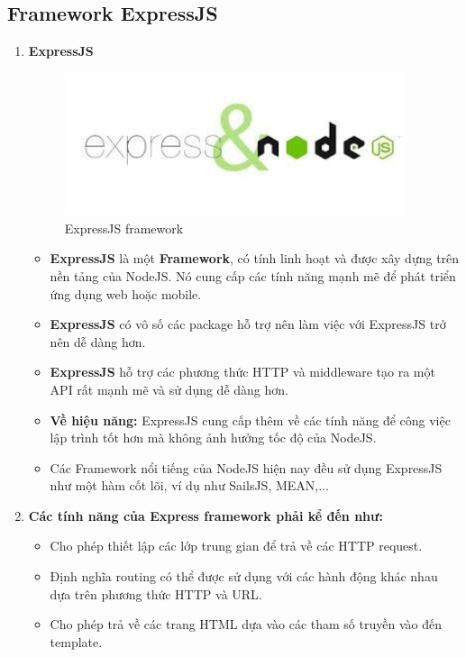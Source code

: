 \subsection{Framework ExpressJS}
\begin{enumerate}
    \item \textbf{ExpressJS}
    \begin{figure}[H]
        \centering
        \includegraphics[width = 10cm]{image/express-js.jpg}
        \caption{ExpressJS framework}
        \label{fig:express_JS_framework}
    \end{figure}
    \begin{itemize}
        \item \textbf{ExpressJS} là một \textbf{Framework}, có tính linh hoạt và được xây dựng trên nền tảng của NodeJS. Nó cung cấp các tính năng mạnh mẽ để phát triển ứng dụng web hoặc mobile.
        \item \textbf{ExpressJS} có vô số các package hỗ trợ nên làm việc với ExpressJS trở nên dễ dàng hơn.
        \item \textbf{ExpressJS} hỗ trợ các phương thức HTTP và middleware tạo ra một API rất mạnh mẽ và sử dụng dễ dàng hơn.
        \item \textbf{Về hiệu năng:} ExpressJS cung cấp thêm về các tính năng để công việc lập trình tốt hơn mà không ảnh hưởng tốc độ của NodeJS.
        \item Các Framework nổi tiếng của NodeJS hiện nay đều sử dụng ExpressJS như một hàm cốt lõi, ví dụ như SailsJS, MEAN,...
    \end{itemize}
    \item \textbf{Các tính năng của Express framework phải kể đến như:}
    \begin{itemize}
        \item Cho phép thiết lập các lớp trung gian để trả về các HTTP request.
        \item Định nghĩa routing có thể được sử dụng với các hành động khác nhau dựa trên phương thức HTTP và URL.
        \item Cho phép trả về các trang HTML dựa vào các tham số truyền vào đến template.

\end{itemize}
\end{enumerate}

